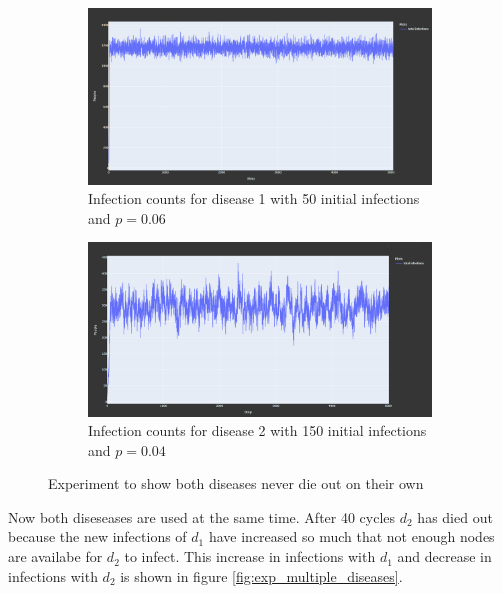 \begin{figure}
    \centering
    \begin{subfigure}[b]{0.475\textwidth}
        \centering
        \includegraphics[width=\textwidth]{images/exp_multiple_diseases_d1.png}
        \caption[Network2]%
        {{\small Infection counts for disease 1 with 50 initial infections and $p = 0.06$}}   
    \end{subfigure}
    \hfill
    \begin{subfigure}[b]{0.475\textwidth}  
        \centering 
        \includegraphics[width=\textwidth]{images/exp_multiple_diseases_d2.png}
        \caption[]%
        {{\small Infection counts for disease 2 with 150 initial infections and $p = 0.04$}}    
    \end{subfigure}
    \caption[Experiment to show both diseases never die out on their own]
    {\small Experiment to show both diseases never die out on their own} 
    \label{fig:exp_multiple_diseases_individual}
\end{figure}

Now both diseseases are used at the same time. After 40 cycles
$d_2$ has died out because the new infections of $d_1$ have increased so much that
not enough nodes are availabe for $d_2$ to infect. This increase in infections with $d_1$ and
decrease in infections with $d_2$ is shown in figure \ref{fig:exp_multiple_diseases}.

